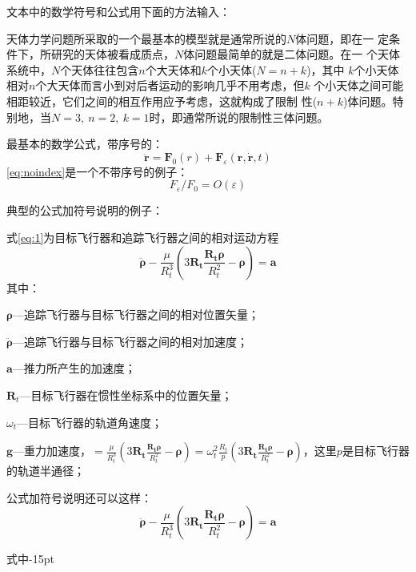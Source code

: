 文本中的数学符号和公式用下面的方法输入：

天体力学问题所采取的一个最基本的模型就是通常所说的$N$体问题，即在一
定条件下，所研究的天体被看成质点，$N$体问题最简单的就是二体问题。在一
个天体系统中，$N$个天体往往包含$n$个大天体和$k$个小天体($N=n+k$)，其中
$k$个小天体相对$n$个大天体而言小到对后者运动的影响几乎不用考虑，但$k$
个小天体之间可能相距较近，它们之间的相互作用应予考虑，这就构成了限制
性($n+k$)体问题。特别地，当$N=3,~n=2,~k=1$时，即通常所说的限制性三体问题。


最基本的数学公式，带序号的：
\begin{equation}
\ddot{\mathbf{r}}=\mathbf{F}_{0}(r)+\mathbf{F}_{\varepsilon}(\mathbf{r},\dot{\mathbf{r}},t)
\end{equation}
\eqref{eq:noindex}是一个不带序号的例子：
\begin{displaymath}\label{eq:noindex}
F_{\varepsilon}/F_{0}=O (\varepsilon)
\end{displaymath}

\FloatBarrier %
典型的公式加符号说明的例子：

式\eqref{eq:1}为目标飞行器和追踪飞行器之间的相对运动方程
\begin{equation}\label{eq:1}
\ddot{\boldsymbol{\rho}}-\frac{\mu}{R_{t}^{3}}\left( 3\mathbf{R_{t}}\frac{\mathbf{R_{t}\rho}}{R_{t}^{2}}-\boldsymbol{\rho}\right)=\mathbf{a}
\end{equation}
其中：

$\boldsymbol{\rho}$---追踪飞行器与目标飞行器之间的相对位置矢量；

$\ddot{\boldsymbol{\rho}}$---追踪飞行器与目标飞行器之间的相对加速度；

$\mathbf{a}$---推力所产生的加速度；

$\mathbf{R}_{t}$---目标飞行器在惯性坐标系中的位置矢量；

$\omega_{t}$---目标飞行器的轨道角速度；

$\mathbf{g}$---重力加速度，$=\frac{\mu}{R_{t}^{3}}\left(
3\mathbf{R_{t}}\frac{\mathbf{R_{t}\rho}}{R_{t}^{2}}-\boldsymbol{\rho}\right)=\omega_{t}^{2}\frac{R_{t}}{p}\left(
3\mathbf{R_{t}}\frac{\mathbf{R_{t}\rho}}{R_{t}^{2}}-\boldsymbol{\rho}\right)$，这里$p$是目标飞行器的轨道半通径；

公式加符号说明还可以这样：
\begin{equation}\label{eq:111}
\ddot{\boldsymbol{\rho}}-\frac{\mu}{R_{t}^{3}}\left( 3\mathbf{R_{t}}\frac{\mathbf{R_{t}\rho}}{R_{t}^{2}}-\boldsymbol{\rho}\right)=\mathbf{a}
\end{equation}
\begin{formulasymb}{式中}{-15pt}%
\end{formulasymb}

